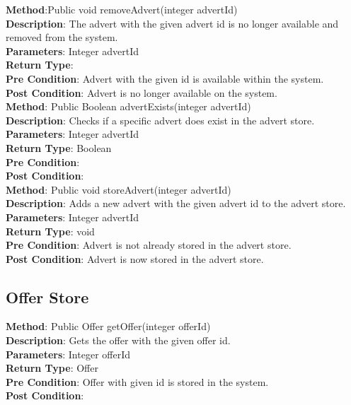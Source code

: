 \documentclass{l3deliverable}
\begin{document}
\textbf{Method}:Public void removeAdvert(integer advertId)\\
\textbf{Description}: The advert with the given advert id is no longer available and removed from the system.\\
\textbf{Parameters}: Integer advertId\\
\textbf{Return Type}: \\
\textbf{Pre Condition}: Advert with the given id is available within the system.\\
\textbf{Post Condition}: Advert is no longer available on the system.\\

\textbf{Method}: Public Boolean advertExists(integer advertId)\\
\textbf{Description}: Checks if a specific advert does exist in the advert store.\\
\textbf{Parameters}: Integer advertId\\
\textbf{Return Type}: Boolean\\
\textbf{Pre Condition}:\\
\textbf{Post Condition}:\\

\textbf{Method}: Public void storeAdvert(integer advertId)\\
\textbf{Description}: Adds a new advert with the given advert id to the advert store. \\
\textbf{Parameters}: Integer advertId\\
\textbf{Return Type}: void\\
\textbf{Pre Condition}: Advert is not already stored in the advert store.\\
\textbf{Post Condition}: Advert is now stored in the advert store.\\

\subsection{Offer Store}

\textbf{Method}: Public Offer getOffer(integer offerId)\\ 
\textbf{Description}: Gets the offer with the given offer id. \\
\textbf{Parameters}: Integer offerId\\
\textbf{Return Type}: Offer\\
\textbf{Pre Condition}: Offer with given id is stored in the system.\\
\textbf{Post Condition}:\\
\end{document}

